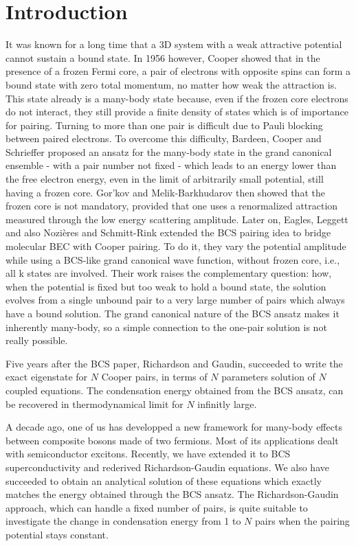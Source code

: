 \documentclass[5p,twocolumn]{elsarticle}
\begin{document}
\section{Introduction}
It was known for a long time that a 3D system with a weak attractive potential cannot sustain a bound state.  In 1956 however, Cooper showed that in the presence of a frozen Fermi core, a pair of electrons with opposite spins can form a bound state with zero total momentum,  no matter how weak the attraction is\cite{Cooper}.  This state already is a many-body state because, even if the frozen core electrons do not interact, they still provide a finite density of states which is of importance for pairing. Turning to more than one pair is difficult due to Pauli blocking between paired electrons. To overcome this difficulty, Bardeen, Cooper and Schrieffer proposed an ansatz for the many-body state in the grand canonical ensemble - with a pair number not fixed - which leads to an energy lower than the free electron energy, even in the limit of arbitrarily small potential, still having a frozen core\cite{BCS}. Gor'kov and Melik-Barkhudarov then showed that the frozen core is not mandatory, provided that one uses a renormalized attraction measured through the low energy scattering amplitude\cite{Gorkov}.   Later on, Eagles\cite{Eagle}, Leggett\cite{LeggettCrossover} and also Nozi\`{e}res and Schmitt-Rink\cite{Nozieres} extended the BCS pairing idea to bridge molecular BEC with Cooper pairing. To do it, they vary the potential amplitude while using a BCS-like grand canonical wave function, without frozen core, i.e., all k states are involved.  Their work raises the complementary question: how, when the potential is fixed but too weak to hold a bound state, the solution evolves from a single unbound pair to a very large number of pairs which always have  a bound solution. The grand canonical nature of the BCS ansatz makes it inherently many-body, so a simple connection to the one-pair solution is not really possible.  

Five years after the BCS paper, Richardson\cite{Richardson1} and Gaudin\cite{gaudin}, succeeded to write the exact eigenstate for $N$ Cooper pairs, in terms of $N$ parameters solution of $N$ coupled equations. The condensation energy obtained from the BCS ansatz, can be recovered in thermodynamical limit for $N$ infinitly large\cite{Richardson2,Richardson3,Richardson1968}. 

A decade ago, one of us has developped a new framework\cite{CobosonPhysicsReports} for many-body effects between composite bosons made of two fermions. Most of its applications dealt with semiconductor excitons.   Recently, we have extended it to BCS superconductivity and rederived Richardson-Gaudin equations\cite{CobosonBcsRich}. We also have succeeded to obtain an analytical solution of these equations which exactly matches the energy obtained through the BCS ansatz\cite{CombescotCooper,combescotBCS}.  The Richardson-Gaudin approach, which can handle a fixed number of pairs, is quite suitable to investigate the change in condensation energy from 1 to $N$ pairs when the pairing potential stays constant.
\end{document}
